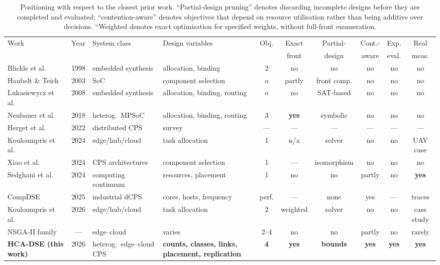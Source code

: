 \begin{table}[t]
\centering
\caption{Positioning with respect to the closest prior work. ``Partial-design pruning''
denotes discarding incomplete designs before they are completed and evaluated;
``contention-aware'' denotes objectives that depend on resource utilisation rather than
being additive over decisions. ``Weighted denotes exact optimisation for specified weights, without full-front enumeration.}
\label{tab:related}
\scriptsize
\setlength{\tabcolsep}{3pt}
\begin{tabular}{@{}p{2.5cm}c>{\raggedright\arraybackslash}p{1.95cm}>{\raggedright\arraybackslash}p{2.05cm}cccccc@{}}
\toprule
Work & Year & System class & Design variables & Obj. & Exact & Partial- & Cont.- &
Exp. & Real \\
 & & & & & front & design & aware & eval. & meas. \\
\midrule
Blickle et al.~\cite{blickle1998system} & 1998 & embedded synthesis &
  allocation, binding & 2 & no & no & no & no & no \\
Haubelt \& Teich~\cite{haubelt2003pareto} & 2003 & SoC & component selection & $n$ &
  partly & front comp. & no & no & no \\
Lukasiewycz et al.~\cite{lukasiewycz2008symbolic} & 2008 & embedded synthesis &
  allocation, binding, routing & $n$ & no & SAT-based & no & no & no \\
Neubauer et al.~\cite{neubauer2018exact} & 2018 & heterog.\ MPSoC &
  allocation, binding, routing & 3 & \textbf{yes} & symbolic & no & no & no \\
Herget et al.~\cite{herget2022dse} & 2022 & distributed CPS & survey & --- & --- &
  --- & --- & --- & --- \\
Kouloumpris et al.~\cite{kouloumpris2024optimization} & 2024 & edge/\allowbreak hub/\allowbreak cloud &
  task allocation & 1 & n/a & solver & no & no & UAV case \\
Xiao et al.~\cite{xiao2024contrarc} & 2024 & CPS architectures &
  component selection & 1 & --- & isomorphism & no & no & no \\
Sedghani et al.~\cite{sedghani2024space4aid} & 2024 & computing continuum &
  resources, placement & 1 & no & no & partly & no & \textbf{yes} \\
CompDSE~\cite{saadatmand2025compdse} & 2025 & industrial dCPS &
  cores, hosts, frequency & perf. & --- & none & yes & --- & traces \\
Kouloumpris et al.~\cite{kouloumpris2026reliability} & 2026 & edge/\allowbreak hub/\allowbreak cloud &
  task allocation & 2 & weighted & solver & no & no & case study \\
NSGA-II family~\cite{deb2002nsga2} & --- & edge--cloud & varies & 2--4 & no & no &
  partly & no & rarely \\
\textbf{HCA-DSE (this work)} & 2026 & heterog.\ edge--cloud CPS &
  \textbf{counts, classes, links, placement, replication} & \textbf{4} &
  \textbf{yes} & \textbf{bounds} & \textbf{yes} & \textbf{yes} & \textbf{yes} \\
\bottomrule
\end{tabular}
\end{table}
